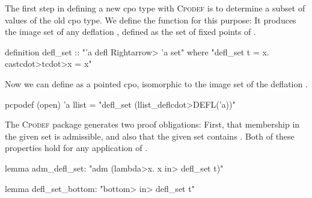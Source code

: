 The first step in defining a new cpo type with \textsc{Cpodef} is to determine a subset of values of the old cpo type. We define the  function for this purpose: It produces the image set of any deflation , defined as the set of fixed points of .
\vspace{-22pt} %
\begin{isacode}
definition defl_set :: "'a defl \<Rightarrow> 'a set"
  where "defl_set t = {x. cast\<cdot>t\<cdot>x = x}"
\end{isacode}
%
Now we can define  as a pointed cpo, isomorphic to the image set of the deflation .
%
\begin{isacode}
pcpodef (open) 'a llist = "defl_set (llist_defl\<cdot>DEFL('a))"
\end{isacode}
%
The \textsc{Cpodef} package generates two proof obligations: First, that membership in the given set is admissible, and also that the given set contains . Both of these properties hold for any application of .

\begin{isacode}
lemma adm_defl_set: "adm (\<lambda>x. x \<in> defl_set t)"
\end{isacode}
\unmedskip
{}
\begin{isacode}
lemma defl_set_bottom: "\<bottom> \<in> defl_set t"
\end{isacode}

